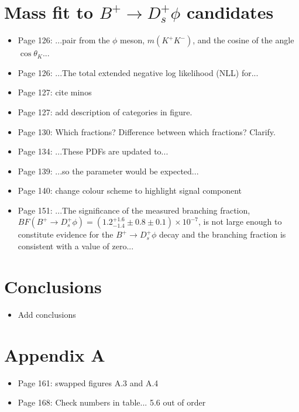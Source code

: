 \documentclass[12pt]{article}
\begin{document}
\section{Mass fit to $B^+ \rightarrow D_s^+ \phi$ candidates}

\begin{itemize}


\item Page 126: ...pair {\color{red}from} the $\phi$ meson, $m(K^+K^-)$, and the cosine of {\color{red}the} angle $\cos\theta_{K}$...
\item Page 126: ...The total extended {\color{red}negative log likelihood} (NLL) for...
\item Page 127: {\color{blue} cite minos}
\item Page 127: {\color{blue} add description of categories in figure.}
\item Page 130: {\color{blue} Which fractions? Difference between which fractions? Clarify.}
\item Page 134: ...These PDFs are {\color{red}updated} to...
\item Page 139: ...so the {\color{red}parameter} would be expected...
\item Page 140: {\color{blue} change colour scheme to highlight signal component}
\item Page 151: ...The {\color{red}significance of} the measured branching fraction, $BF(B^+\rightarrow D_s^+\phi) = (1.2^{+1.6}_{-1.4} \pm 0.8  \pm 0.1)\times 10^{-7}$, is {\color{red}not large enough to constitute evidence} for the $B^+\rightarrow D_s^+\phi$ decay and {\color{red}the branching fraction is consistent with a value of zero}...

\end{itemize}
\section{Conclusions}

\begin{itemize}
\item Add conclusions

\end{itemize}
\section{Appendix A}

\begin{itemize}
\item Page 161: swapped figures A.3 and A.4
\item Page 168: {\color{blue} Check numbers in table... 5.6 out of order}

\end{itemize}
\end{document}
